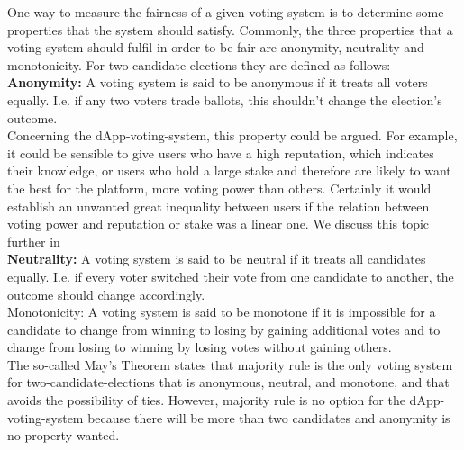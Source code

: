 
One way to measure the fairness of a given voting system is to determine some properties that the system should satisfy. 
Commonly, the three properties that a voting system should fulfil in order to be fair are anonymity, neutrality and monotonicity. For two-candidate elections they are defined as follows: \\
{\bf{Anonymity:}} A voting system is said to be anonymous if it treats all voters equally. I.e. if any two voters trade ballots, this shouldn't change the election's outcome. \\
Concerning the dApp-voting-system, this property could be argued. For example, it could be sensible to give users who have a high reputation, which indicates their knowledge, or users who hold a large stake and therefore are likely to want the best for the platform, more voting power than others. Certainly it would establish an unwanted great inequality between users if the relation between voting power and reputation or stake was a linear one. We discuss this topic further in \\%
{\bf{Neutrality:}} A voting system is said to be neutral if it treats all candidates equally. I.e. if every voter switched their vote from one candidate to another, the outcome should change accordingly. \\
Monotonicity: A voting system is said to be monotone if it is impossible for a candidate to change from winning to losing by gaining additional votes and to change from losing to winning by losing votes without gaining others. \\
The so-called May's Theorem states that majority rule %
is the only voting system for two-candidate-elections that is anonymous, neutral, and monotone, and that avoids the possibility of ties. However, majority rule is no option for the dApp-voting-system because there will be more than two candidates and anonymity is no property wanted. \\


